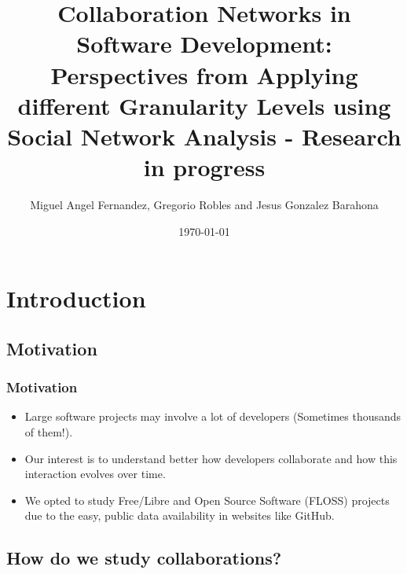 \documentclass{beamer}
\title[SATToSE 2015]{Collaboration Networks in Software Development: Perspectives from Applying different Granularity Levels using Social Network Analysis - Research in progress} %
\author{Miguel Angel Fernandez, Gregorio Robles and Jesus Gonzalez Barahona} %
\institute[UCLA] %
{
GSyC/LibreSoft, Rey Juan Carlos University \\ %
\medskip
\textit{(ma.fernandezsa@alumnos, grex@)urjc.es; jgb@bitergia.com} %
}
\date{\today} %
\begin{document}
\begin{frame}
\titlepage %
\end{frame}


\section{Introduction} %

\subsection{Motivation} %

\begin{frame}
\frametitle{Motivation}
\begin{itemize}
\item Large software projects may involve a lot of developers (Sometimes thousands of them!).
\item Our interest is to understand better how developers collaborate and how this interaction evolves over time.
\item We opted to study Free/Libre and Open Source Software (FLOSS) projects due to the easy, public data availability in websites like GitHub.
\end{itemize}
\end{frame}


\subsection{How do we study collaborations?}
\end{document}
